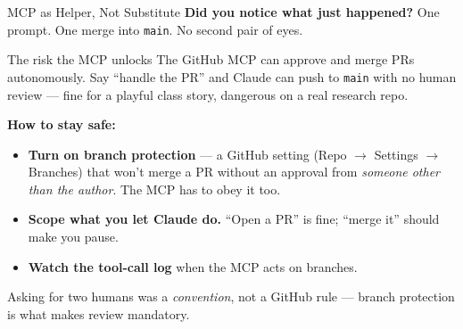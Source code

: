 \documentclass[aspectratio=169, 11pt]{beamer}
\begin{document}
\begin{frame}{MCP as Helper, Not Substitute}
  \textbf{Did you notice what just happened?} One prompt. One merge into \texttt{main}. No second pair of eyes.

  \vspace{0.3em}
  \begin{alertblock}{The risk the MCP unlocks}
    The GitHub MCP can approve and merge PRs autonomously. Say ``handle the PR'' and Claude can push to \texttt{main} with no human review --- fine for a playful class story, dangerous on a real research repo.
  \end{alertblock}

  \vspace{0.3em}
  \textbf{How to stay safe:}
  \begin{itemize}\small
    \item \textbf{Turn on branch protection} --- a GitHub setting (Repo $\rightarrow$ Settings $\rightarrow$ Branches) that won't merge a PR without an approval from \emph{someone other than the author}. The MCP has to obey it too.
    \item \textbf{Scope what you let Claude do.} ``Open a PR'' is fine; ``merge it'' should make you pause.
    \item \textbf{Watch the tool-call log} when the MCP acts on branches.
  \end{itemize}

  \vspace{0.3em}
  \alert{\small Asking for two humans was a \emph{convention}, not a GitHub rule --- branch protection is what makes review mandatory.}
  \vfill
  \hyperlink{backmatter}{}
\end{frame}


\end{document}
